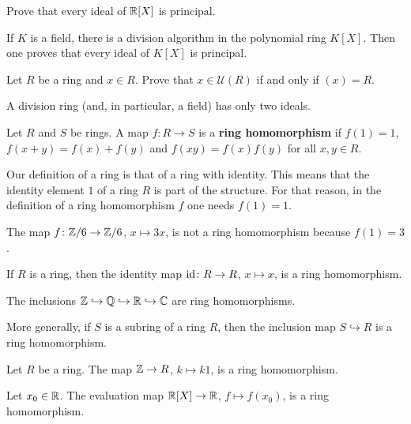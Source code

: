 \begin{exercise}
	Prove that every ideal of $\mathbb{R}[X]$ is principal. 
\end{exercise}

If $K$ is a field, there is a division algorithm in the 
polynomial ring $K[X]$. Then one proves 
that every ideal of $K[X]$ is principal.  

\begin{exercise}
	Let $R$ be a ring and $x\in R$. Prove that $x\in\mathcal{U}(R)$ if and only if
	$(x)=R$. 	
\end{exercise}

A division ring (and, in particular, a field) has only two ideals. 

\begin{definition}
Let $R$ and $S$ be rings. A map $f\colon R\to S$ is a \textbf{ring homomorphism}  
if $f(1)=1$, $f(x+y)=f(x)+f(y)$ and $f(xy)=f(x)f(y)$ for all $x,y\in R$. 	
\end{definition}

Our definition of a ring is that of a ring with identity. This means
that the identity element $1$ of a ring $R$ 
is part of the structure. For that reason, in 
the definition
of a ring homomorphism $f$ one needs $f(1)=1$.  

\begin{example}
The map $f\colon\mathbb{Z}/6\to\mathbb{Z}/6$, $x\mapsto 3x$, is not a ring homomorphism because
$f(1)=3$. 	
\end{example}
 
If $R$ is a ring, then  
the identity map $\operatorname{id}\colon R\to R$, $x\mapsto x$, is a ring homomorphism. 	

\begin{example}
The inclusions $\mathbb{Z}\hookrightarrow\mathbb{Q}\hookrightarrow\mathbb{R}\hookrightarrow\mathbb{C}$ 
are ring homomorphisms. 	
\end{example}

More generally, if $S$ is a subring of a ring $R$, then the inclusion map 
$S\hookrightarrow R$ is a ring homomorphism. 

\begin{example}
Let $R$ be a ring. 
The map $\mathbb{Z}\to R$, $k\mapsto k1$, is a ring homomorphism. 	
\end{example}

\begin{example}
Let $x_0\in\mathbb{R}$. The evaluation map $\mathbb{R}[X]\to\mathbb{R}$, $f\mapsto f(x_0)$, 
is a ring homomorphism. 	
\end{example}


